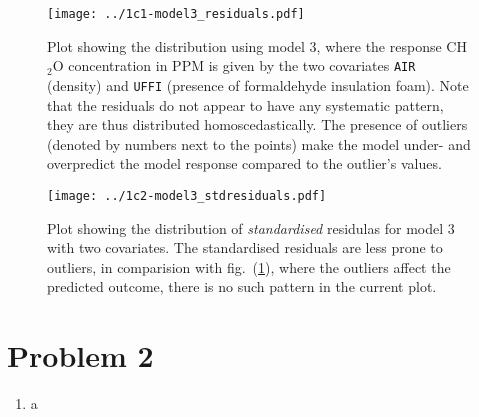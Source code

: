\documentclass[a4paper,11pt]{article}
\begin{document}
\begin{enumerate}[label=\alph*)]
        \begin{figure}[htb]
            \centering
            \texttt{[image: ../1c1-model3\_residuals.pdf]}
            \caption{Plot showing the distribution using model 3, where the response CH$_2$O concentration in PPM is given by the two covariates \texttt{AIR} (density) and \texttt{UFFI} (presence of formaldehyde insulation foam). Note that the residuals do not appear to have any systematic pattern, they are thus distributed homoscedastically. The presence of outliers (denoted by numbers next to the points) make the model under- and overpredict the model response compared to the outlier's values. }
            \label{fig:1c-1}
        \end{figure}
        \begin{figure}[htb]
            \centering
            \texttt{[image: ../1c2-model3\_stdresiduals.pdf]}
            \caption{Plot showing the distribution of \textit{standardised} residulas for model 3 with two covariates. The standardised residuals are less prone to outliers, in comparision with fig.~(\ref{fig:1c-1}), where the outliers affect the predicted outcome, there is no such pattern in the current plot. }
            \label{fig:1c-2}
        \end{figure}
\end{enumerate}

\section*{Problem 2}
\begin{enumerate}[label=\alph*)]

    \item a
\end{enumerate}
\end{document}
